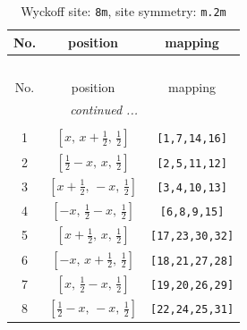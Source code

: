 \documentclass[fleqn,8pt]{jsarticle}
\begin{document}
\begin{longtable}{ccc}
\caption{Wyckoff site: {\tt 8m}, site symmetry: {\tt m.2m}}
 \\
 \hline \hline
No. & position & mapping \\ \hline \endfirsthead

\multicolumn{2}{l}{\tablename\ \thetable{}} \\
 \hline \hline
No. & position & mapping \\ \hline \endhead

 \hline \hline
\multicolumn{2}{r}{\footnotesize\it continued ...} \\ \endfoot

 \hline \hline
\multicolumn{2}{r}{} \\ \endlastfoot

1 & $\left[ x,\, x + \frac{1}{2},\, \frac{1}{2} \right]$ & {\tt [1,7,14,16]} \\ \hline
2 & $\left[ \frac{1}{2} - x,\, x,\, \frac{1}{2} \right]$ & {\tt [2,5,11,12]} \\ \hline
3 & $\left[ x + \frac{1}{2},\, - x,\, \frac{1}{2} \right]$ & {\tt [3,4,10,13]} \\ \hline
4 & $\left[ - x,\, \frac{1}{2} - x,\, \frac{1}{2} \right]$ & {\tt [6,8,9,15]} \\ \hline
5 & $\left[ x + \frac{1}{2},\, x,\, \frac{1}{2} \right]$ & {\tt [17,23,30,32]} \\ \hline
6 & $\left[ - x,\, x + \frac{1}{2},\, \frac{1}{2} \right]$ & {\tt [18,21,27,28]} \\ \hline
7 & $\left[ x,\, \frac{1}{2} - x,\, \frac{1}{2} \right]$ & {\tt [19,20,26,29]} \\ \hline
8 & $\left[ \frac{1}{2} - x,\, - x,\, \frac{1}{2} \right]$ & {\tt [22,24,25,31]} \\
\end{longtable}
\renewcommand{\arraystretch}{1.2}
\end{document}

